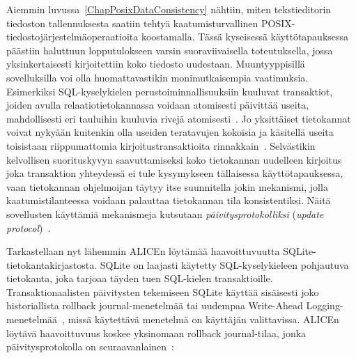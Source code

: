 Aiemmin luvussa~\ref{ChapPosixDataConsistency} nähtiin,
miten tekstieditorin tiedoston tallennuksesta saatiin tehtyä kaatumisturvallinen POSIX-tiedostojärjestelmäoperaatioita koostamalla.
Tässä kyseisessä käyttötapauksessa päästiin haluttuun lopputulokseen varsin suoraviivaisella toteutuksella, jossa yksinkertaisesti kirjoitettiin koko tiedosto uudestaan.
Muuntyyppisillä sovelluksilla voi olla huomattavastikin monimutkaisempia vaatimuksia.
Esimerkiksi SQL-kyselykielen perustoiminnallisuuksiin kuuluvat transaktiot,
joiden avulla relaatiotietokannassa voidaan atomisesti päivittää useita, mahdollisesti eri tauluihin kuuluvia rivejä atomisesti~\cite{DatabaseFundamentals}.
Jo yksittäiset tietokannat voivat nykyään kuitenkin olla useiden teratavujen kokoisia ja käsitellä useita toisistaan riippumattomia kirjoitustransaktioita rinnakkain~\cite{DatabaseFundamentals}.
Selvästikin kelvollisen suorituskyvyn saavuttamiseksi koko tietokannan uudelleen kirjoitus joka transaktion yhteydessä ei tule kysymykseen tällaisessa käyttötapauksessa,
vaan tietokannan ohjelmoijan täytyy itse suunnitella jokin mekanismi,
jolla kaatumistilanteessa voidaan palauttaa tietokannan tila konsistentiksi.
Näitä sovellusten käyttämiä mekanismeja kutsutaan \emph{päivitysprotokolliksi} (\emph{update protocol})~\cite{PosixDataConsistency}.

Tarkastellaan nyt lähemmin ALICEn löytämää haavoittuvuutta SQLite-tietokantakirjastosta.
SQLite on laajasti käytetty SQL-kyselykieleen pohjautuva tietokanta,
joka tarjoaa täyden tuen SQL-kielen transaktioille.
Transaktionaalisten päivitysten tekemiseen SQLite käyttää sisäisesti joko historiallista rollback journal-menetelmää tai uudempaa Write-Ahead Logging-menetelmää~\cite{SqliteAnalysis},
missä käytettävä menetelmä on käyttäjän valittavissa.
ALICEn löytävä haavoittuvuus koskee yksinomaan rollback journal-tilaa,
jonka päivitysprotokolla on seuraavanlainen~\cite{PosixDataConsistency}:

